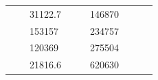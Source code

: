 \begin{table}[]
\begin{tabular}{|cclccllll}
\multicolumn{1}{|c|}{\cellcolor[HTML]{FFFFC7}}                                & \multicolumn{1}{c|}{\cellcolor[HTML]{DDFDFF}}                      & \multicolumn{1}{l|}{\cellcolor[HTML]{DAE8FC}31122.7}   & \multicolumn{1}{c|}{\cellcolor[HTML]{FFFFC7}}                                & \multicolumn{1}{c|}{\cellcolor[HTML]{DDFDFF}}                       & \multicolumn{1}{l|}{\cellcolor[HTML]{DDFDFF}146870}    &                                                                              &                                                                    &                                                        \\ \cline{3-3} \cline{6-6}
\multicolumn{1}{|c|}{\cellcolor[HTML]{FFFFC7}}                                & \multicolumn{1}{c|}{\cellcolor[HTML]{DDFDFF}}                      & \multicolumn{1}{l|}{\cellcolor[HTML]{DDFDFF}153157}    & \multicolumn{1}{c|}{\cellcolor[HTML]{FFFFC7}}                                & \multicolumn{1}{c|}{\cellcolor[HTML]{DDFDFF}}                       & \multicolumn{1}{l|}{\cellcolor[HTML]{DAE8FC}234757}    &                                                                              &                                                                    &                                                        \\ \cline{3-3} \cline{6-6}
\multicolumn{1}{|c|}{\cellcolor[HTML]{FFFFC7}}                                & \multicolumn{1}{c|}{\cellcolor[HTML]{DDFDFF}}                      & \multicolumn{1}{l|}{\cellcolor[HTML]{DAE8FC}120369}    & \multicolumn{1}{c|}{\cellcolor[HTML]{FFFFC7}}                                & \multicolumn{1}{c|}{\cellcolor[HTML]{DDFDFF}}                       & \multicolumn{1}{l|}{\cellcolor[HTML]{DDFDFF}275504}    &                                                                              &                                                                    &                                                        \\ \cline{3-3} \cline{6-6}
\multicolumn{1}{|c|}{\cellcolor[HTML]{FFFFC7}}                                & \multicolumn{1}{c|}{\cellcolor[HTML]{DDFDFF}}                      & \multicolumn{1}{l|}{\cellcolor[HTML]{DDFDFF}21816.6}   & \multicolumn{1}{c|}{\cellcolor[HTML]{FFFFC7}}                                & \multicolumn{1}{c|}{\cellcolor[HTML]{DDFDFF}}                       & \multicolumn{1}{l|}{\cellcolor[HTML]{DAE8FC}620630}    &                                                                              &                                                                    &                                                        \\ \cline{3-3} \cline{6-6}

\end{tabular}
\end{table}
